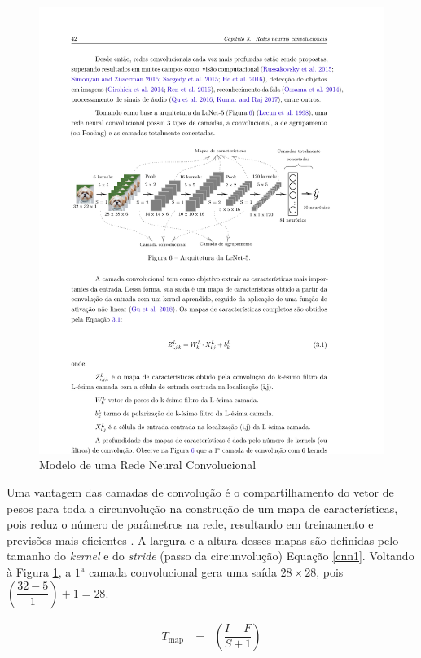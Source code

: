  \begin{figure}[!htb]
 	\centering
 	\caption{Modelo de uma Rede Neural Convolucional}
 	\includegraphics[width=1\linewidth]{Modelos/Figuras/cnn}
 	
 	\label{fig:cnn}
 \end{figure}
 
 
 Uma vantagem das camadas de convolução é o compartilhamento do vetor de pesos para toda a circunvolução na construção de um mapa de características, pois reduz o número de parâmetros na rede, resultando em treinamento e previsões mais eficientes
 \cite{lucas_2019}.
 A largura e a altura desses mapas são definidas pelo tamanho do \textit{kernel} e do \textit{stride} (passo da circunvolução) Equação \eqref{cnn1}. Voltando à Figura \ref{fig:cnn}, a $1^{\mathrm{a}}$ camada convolucional gera uma saída $28 \times 28$, pois $\left(\dfrac{32-5}{1}\right)+1=28$.
 
 \begin{eqnarray}
 	T_{\text {map }}&=&\left(\dfrac{I-F}{S+1}\right)\label{cnn1}
 \end{eqnarray}
 
